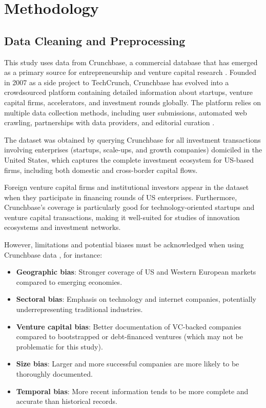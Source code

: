 \section{Methodology}

\subsection{Data Cleaning and Preprocessing}

This study uses data from Crunchbase, a commercial database that has emerged as a primary source for entrepreneurship and venture capital research \cite{OECD2017}. Founded in 2007 as a side project to TechCrunch, Crunchbase has evolved into a crowdsourced platform containing detailed information about startups, venture capital firms, accelerators, and investment rounds globally. The platform relies on multiple data collection methods, including user submissions, automated web crawling, partnerships with data providers, and editorial curation \cite{OECD2017}.

The dataset was obtained by querying Crunchbase for all investment transactions involving enterprises (startups, scale-ups, and growth companies) domiciled in the United States, which captures the complete investment ecosystem for US-based firms, including both domestic and cross-border capital flows. 

Foreign venture capital firms and institutional investors appear in the dataset when they participate in financing rounds of US enterprises. Furthermore, Crunchbase's coverage is particularly good for technology-oriented startups and venture capital transactions, making it well-suited for studies of innovation ecosystems and investment networks.

However, limitations and potential biases must be acknowledged when using Crunchbase data \cite{OECD2017}, for instance:

\begin{itemize}
    \item \textbf{Geographic bias}: Stronger coverage of US and Western European markets compared to emerging economies.
    \item \textbf{Sectoral bias}: Emphasis on technology and internet companies, potentially underrepresenting traditional industries.
    \item \textbf{Venture capital bias}: Better documentation of VC-backed companies compared to bootstrapped or debt-financed ventures (which may not be problematic for this study).
    \item \textbf{Size bias}: Larger and more successful companies are more likely to be thoroughly documented.
    \item \textbf{Temporal bias}: More recent information tends to be more complete and accurate than historical records.
\end{itemize}

